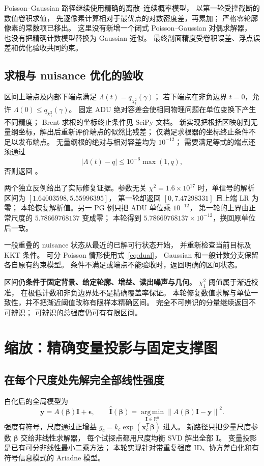 \documentclass[UTF8,11pt,a4paper,fontset=fandol]{ctexart}
\newcommand{\R}{\mathbb R}
\newcommand{\argmin}{\operatorname*{arg\,min}}
\newcommand{\norm}[1]{\left\lVert#1\right\rVert}
\newcommand{\T}{^{\mathsf T}}
\begin{document}
Poisson--Gaussian 路径继续使用精确的离散--连续概率模型，
以第一轮受控截断的数值卷积求值，
先逐像素计算相对于最优点的对数密度差，再累加；
严格零轮廓像素的常数项已移出。
这里没有新增一个闭式 Poisson--Gaussian 对偶求解器，
也没有把精确计数模型替换为 Gaussian 近似。
最终剖面精度受卷积误差、浮点误差和优化验收共同约束。

\subsection{求根与 nuisance 优化的验收}

区间上端点及内部下端点满足 $\Lambda(t)=q_{\chi^2_1}(\gamma)$；
若下端点在非负边界 $t=0$，允许 $\Lambda(0)\le q_{\chi^2_1}(\gamma)$。
固定 ADU 绝对容差会使相同物理问题在单位变换下产生不同精度；
Brent 求根的坐标终止条件见 SciPy 文档\cite{scipybrent}。
新实现把根括区映射到无量纲坐标，解出后重新评价端点的似然比残差；
仅满足求根器的坐标终止条件不足以发布端点。
无量纲根的绝对与相对容差均为 $10^{-12}$；
需要满足等式的端点还须通过
\[
|\Lambda(t)-q|\le10^{-6}\max(1,q),
\]
否则返回 。

两个独立反例给出了实际修复证据。参数无关 $\chi^2=1.6\times10^{17}$
时，单信号的解析区间为 $[1.64003598,5.55996395]$，
第一轮却返回 $[0,7.47298331]$ 且上端 LR 为零；
本轮恢复解析值。另一 PG 例只把 ADU 单位乘 $10^{-12}$，
第一轮的上界由正常尺度的 $5.78669768137$ 变成零；
本轮得到 $5.78669768137\times10^{-12}$，换回原单位后一致。

一般重叠的 nuisance 状态从最近的已解可行状态开始，
并重新检查当前目标及 KKT 条件。
可分 Poisson 情形使用式~\eqref{eq:dual}，
Gaussian 和一般计数分支保留各自原有约束模型。
条件不满足或端点不能验收时，返回明确的区间状态。

区间仍\textbf{条件于固定背景、给定轮廓、增益、读出噪声与几何}。
$\chi^2_1$ 阈值属于渐近校准，
在极低计数和非负边界处不是精确覆盖率保证。
本轮修复数值求解与单位一致性，并不把渐近阈值改称有限样本精确区间。
完全不可辨识的分量继续返回不可辨识；
可辨识的总强度仍可有有限区间。

\section{缩放：精确变量投影与固定支撑图}

\subsection{在每个尺度处先解完全部线性强度}

白化后的全局模型为
\begin{equation}
\bm y=A(\bm\beta)\bm I+\bm\epsilon,\qquad
\widehat{\bm I}(\bm\beta)
=\argmin_{\bm I\in\R^n}\norm{A(\bm\beta)\bm I-\bm y}^2 .
\end{equation}
强度有符号，尺度通过正增益
$g_c=k_c\exp(\bm x_c\T\bm\beta)$ 进入。
新路径只把少量尺度参数 $\bm\beta$ 交给非线性求解器，
每个试探点都用尺度均衡 SVD 解出全部 $\bm I$。
变量投影是已有可分非线性最小二乘方法\cite{golub1973,oleary2013}；
本轮实现针对带重复强度 ID、协方差白化和有符号信息模式的 Ariadne 模型。
\end{document}
